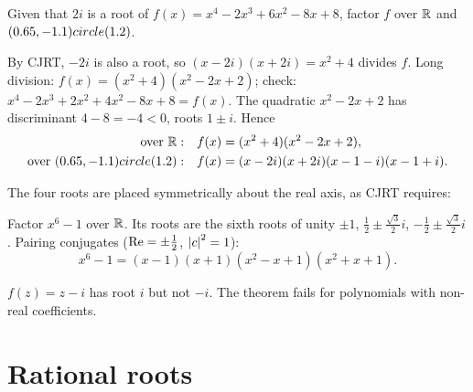 \begin{example}
Given that $2i$ is a root of $f(x) = x^4 - 2x^3 + 6x^2 - 8x + 8$, factor $f$ over $\mathbb{R}$ and $(0.65,-1.1) circle (1.2)$.

By CJRT, $-2i$ is also a root, so $(x - 2i)(x + 2i) = x^2 + 4$ divides $f$. Long division:
$f(x) = (x^2 + 4)(x^2 - 2x + 2)$; check: $x^4 - 2x^3 + 2x^2 + 4x^2 - 8x + 8 = f(x)$.
The quadratic $x^2 - 2x + 2$ has discriminant $4 - 8 = -4 < 0$, roots $1 \pm i$. Hence
\begin{align*}
\text{over } \mathbb{R}:&\quad f(x) = (x^2 + 4)(x^2 - 2x + 2),\\
\text{over } (0.65,-1.1) circle (1.2):&\quad f(x) = (x - 2i)(x + 2i)(x - 1 - i)(x - 1 + i).
\end{align*}
\end{example}

The four roots are placed symmetrically about the real axis, as CJRT requires:
\begin{center}
\end{center}

\begin{example}
Factor $x^6 - 1$ over $\mathbb{R}$. Its roots are the sixth roots of unity
$\pm 1$, $\frac12\pm\frac{\sqrt3}2 i$, $-\frac12 \pm \frac{\sqrt3}2 i$. Pairing conjugates
($\operatorname{Re} = \pm\frac12$, $\left\lvert c \right\rvert^2 = 1$):
\[ x^6 - 1 = (x - 1)(x + 1)(x^2 - x + 1)(x^2 + x + 1). \]
\end{example}

\begin{important}
$f(z) = z - i$ has root $i$ but not $-i$. The theorem fails for polynomials with non-real
coefficients.
\end{important}

\section{Rational roots}

